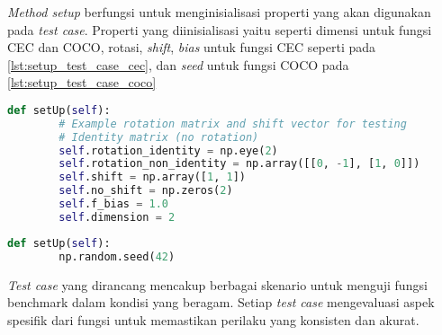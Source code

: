 \textit{Method setup} berfungsi untuk menginisialisasi properti yang akan digunakan pada \textit{test case}. Properti yang diinisialisasi yaitu seperti dimensi untuk fungsi CEC dan COCO, rotasi, \textit{shift}, \textit{bias} untuk fungsi CEC seperti pada \cref{lst:setup_test_case_cec}, dan \textit{seed} untuk fungsi COCO pada \cref{lst:setup_test_case_coco}
\begin{lstlisting}[language=Python, caption=\textit{setup unit test} fungsi CEC, label=lst:setup_test_case_cec]
    def setUp(self):
        # Example rotation matrix and shift vector for testing
        # Identity matrix (no rotation)
        self.rotation_identity = np.eye(2)
        self.rotation_non_identity = np.array([[0, -1], [1, 0]])
        self.shift = np.array([1, 1])
        self.no_shift = np.zeros(2)
        self.f_bias = 1.0
        self.dimension = 2
\end{lstlisting}
\begin{lstlisting}[language=Python, caption=\textit{setup unit test} fungsi COCO, label=lst:setup_test_case_coco]
    def setUp(self):
        np.random.seed(42)
\end{lstlisting}
\textit{Test case} yang dirancang mencakup berbagai skenario untuk menguji fungsi benchmark dalam kondisi yang beragam. Setiap \textit{test case} mengevaluasi aspek spesifik dari fungsi untuk memastikan perilaku yang konsisten dan akurat.

